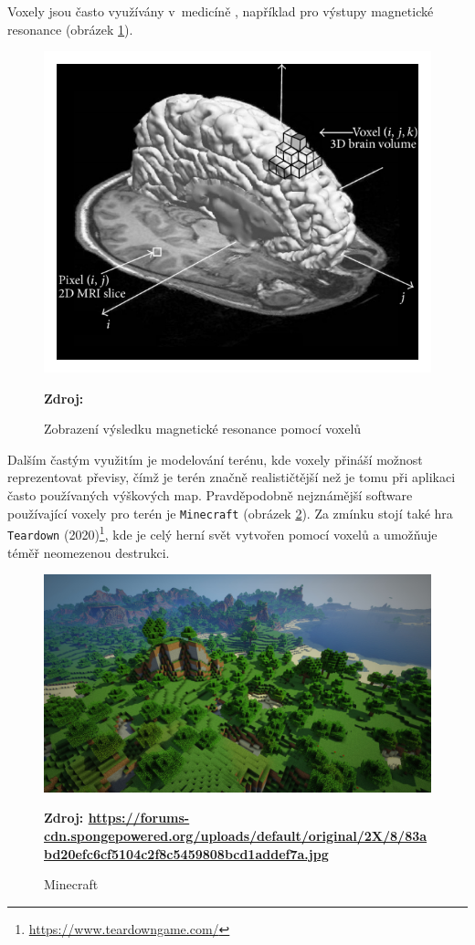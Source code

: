 Voxely jsou často využívány v~medicíně \cite{medical_vox}, například pro výstupy magnetické resonance (obrázek \ref{fig:mri_vox}).

\begin{figure}[H]
	\centering
	\includegraphics[scale=1]{obrazky-figures/voxel_mri.png}
	\caption{Zobrazení výsledku magnetické resonance pomocí voxelů}
	\textbf{Zdroj: \cite{mri}}
	\label{fig:mri_vox}
\end{figure}

Dalším častým využitím je modelování terénu, kde voxely přináší možnost reprezentovat převisy, čímž je terén značně realističtější než je tomu při aplikaci často používaných výškových map. Pravděpodobně nejznámější software používající voxely pro terén je \texttt{Minecraft} (obrázek \ref{fig:minecraft}). Za zmínku stojí také hra \texttt{Teardown} (2020)\footnote{\url{https://www.teardowngame.com/}}, kde je celý herní svět vytvořen pomocí voxelů a umožňuje téměř neomezenou destrukci.

\begin{figure}[H]
	\centering
	\includegraphics[scale=0.13]{obrazky-figures/minecraft.jpg}
	\caption{Minecraft}
	\textbf{Zdroj: \url{https://forums-cdn.spongepowered.org/uploads/default/original/2X/8/83abd20efc6cf5104c2f8c5459808bcd1addef7a.jpg}}
	\label{fig:minecraft}
\end{figure}

